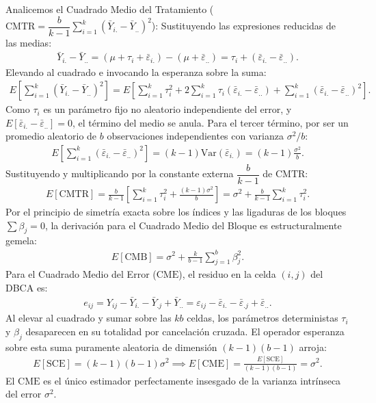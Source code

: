 \begin{solproblema}
\begin{enumerate}
		Analicemos el Cuadrado Medio del Tratamiento ($\text{CMTR} = \dfrac{b}{k-1}\sum_{i=1}^k (\bar{Y}_{i.} - \bar{Y}_{..})^2$):
		Sustituyendo las expresiones reducidas de las medias:
		\begin{align}
			\bar{Y}_{i.} - \bar{Y}_{..} = (\mu + \tau_i + \bar{\varepsilon}_{i.}) - (\mu + \bar{\varepsilon}_{..}) = \tau_i + (\bar{\varepsilon}_{i.} - \bar{\varepsilon}_{..}).
		\end{align}
		Elevando al cuadrado e invocando la esperanza sobre la suma:
		\begin{align}
			E\left[ \sum_{i=1}^k (\bar{Y}_{i.} - \bar{Y}_{..})^2 \right] = E\left[ \sum_{i=1}^k \tau_i^2 + 2\sum_{i=1}^k \tau_i (\bar{\varepsilon}_{i.} - \bar{\varepsilon}_{..}) + \sum_{i=1}^k (\bar{\varepsilon}_{i.} - \bar{\varepsilon}_{..})^2 \right].
		\end{align}
		Como $\tau_i$ es un parámetro fijo no aleatorio independiente del error, y $E[\bar{\varepsilon}_{i.} - \bar{\varepsilon}_{..}] = 0$, el término del medio se anula. Para el tercer término, por ser un promedio aleatorio de $b$ observaciones independientes con varianza $\sigma^2/b$:
		\begin{align}
			E\left[ \sum_{i=1}^k (\bar{\varepsilon}_{i.} - \bar{\varepsilon}_{..})^2 \right] = (k - 1) \text{Var}(\bar{\varepsilon}_{i.}) = (k - 1) \frac{\sigma^2}{b}.
		\end{align}
		Sustituyendo y multiplicando por la constante externa $\dfrac{b}{k-1}$ de $\text{CMTR}$:
		\begin{align}
			E[\text{CMTR}] = \frac{b}{k-1} \left[ \sum_{i=1}^k \tau_i^2 + \frac{(k-1)\sigma^2}{b} \right] = \sigma^2 + \frac{b}{k-1}\sum_{i=1}^k \tau_i^2.
		\end{align}
		Por el principio de simetría exacta sobre los índices y las ligaduras de los bloques $\sum \beta_j = 0$, la derivación para el Cuadrado Medio del Bloque es estructuralmente gemela:
		\begin{align}
			E[\text{CMB}] = \sigma^2 + \frac{k}{b-1}\sum_{j=1}^b \beta_j^2.
		\end{align}
		Para el Cuadrado Medio del Error ($\text{CME}$), el residuo en la celda $(i,j)$ del DBCA es:
		\begin{align}
			e_{ij} = Y_{ij} - \bar{Y}_{i.} - \bar{Y}_{.j} + \bar{Y}_{..} = \varepsilon_{ij} - \bar{\varepsilon}_{i.} - \bar{\varepsilon}_{.j} + \bar{\varepsilon}_{..}.
		\end{align}
		Al elevar al cuadrado y sumar sobre las $kb$ celdas, los parámetros deterministas $\tau_i$ y $\beta_j$ desaparecen en su totalidad por cancelación cruzada. El operador esperanza sobre esta suma puramente aleatoria de dimensión $(k-1)(b-1)$ arroja:
		\begin{align}
			E[\text{SCE}] = (k - 1)(b - 1) \sigma^2 \implies E[\text{CME}] = \frac{E[\text{SCE}]}{(k-1)(b-1)} = \sigma^2.
		\end{align}
		El $\text{CME}$ es el único estimador perfectamente insesgado de la varianza intrínseca del error $\sigma^2$.
		

\end{enumerate}
\end{solproblema}
